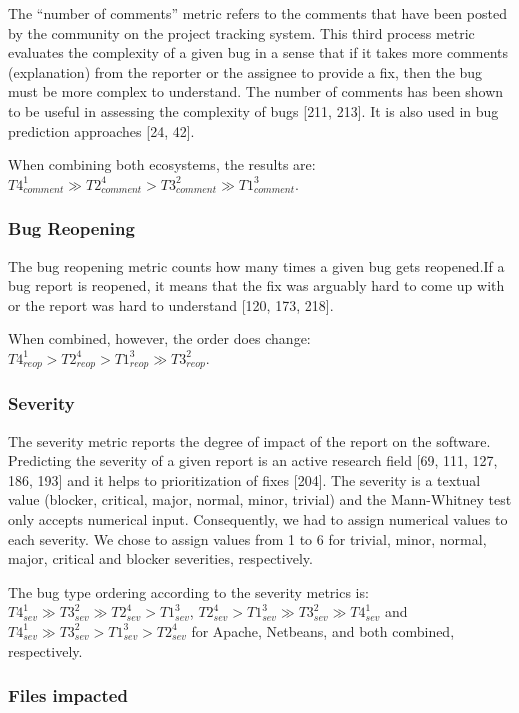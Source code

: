 \documentclass[12pt]{report}
\begin{document}
The ``number of comments'' metric refers to the comments that have been
posted by the community on the project tracking system. This third
process metric evaluates the complexity of a given bug in a sense that
if it takes more comments (explanation) from the reporter or the
assignee to provide a fix, then the bug must be more complex to
understand. The number of comments has been shown to be useful in
assessing the complexity of bugs {[}211, 213{]}. It is also used in bug
prediction approaches {[}24, 42{]}.

When combining both ecosystems, the results are:
\(T4_{comment}^1 \gg T2_{comment}^4 > T3_{comment}^2 \gg T1_{comment}^3\).

\subsubsection{Bug Reopening}\label{bug-reopening}

The bug reopening metric counts how many times a given bug gets
reopened.If a bug report is reopened, it means that the fix was arguably
hard to come up with or the report was hard to understand {[}120, 173,
218{]}.

When combined, however, the order does change:
\(T4_{reop}^1 > T2_{reop}^4 > T1_{reop}^3 \gg T3_{reop}^2\).

\subsubsection{Severity}\label{severity}

The severity metric reports the degree of impact of the report on the
software. Predicting the severity of a given report is an active
research field {[}69, 111, 127, 186, 193{]} and it helps to
prioritization of fixes {[}204{]}. The severity is a textual value
(blocker, critical, major, normal, minor, trivial) and the Mann-Whitney
test only accepts numerical input. Consequently, we had to assign
numerical values to each severity. We chose to assign values from 1 to 6
for trivial, minor, normal, major, critical and blocker severities,
respectively.

The bug type ordering according to the severity metrics is:
\(T4_{sev}^1 \gg T3_{sev}^2 \gg T2_{sev}^4 > T1_{sev}^3\),
\(T2_{sev}^4 > T1_{sev}^3 \gg T3_{sev}^2 \gg T4_{sev}^1\) and
\(T4_{sev}^1 \gg T3_{sev}^2 > T1_{sev}^3 > T2_{sev}^4\) for Apache,
Netbeans, and both combined, respectively.

\subsubsection{Files impacted}\label{files-impacted}
\end{document}
